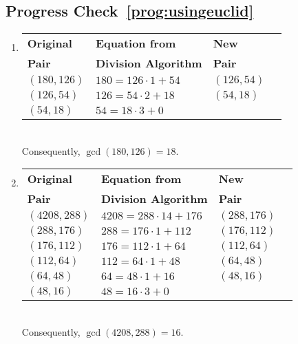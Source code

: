 \subsection*{Progress Check~\ref{prog:usingeuclid}}
\begin{enumerate}
\item \begin{tabular}[t]{| l | l | l | l |}
  \hline
  \textbf{Original}  &  \textbf{Equation from}    &  \textbf{New}    \\
  \textbf{Pair}     &  \textbf{Division Algorithm} &  \textbf{Pair}  \\ \hline
$( {180, 126} )$  &  	$180 = 126 \cdot 1  + 54 $  &  $( {126, 54} )$  \\ \hline
$( {126, 54} )$  &  $126 = 54 \cdot 2 + 18 $   &  $( {54, 18} )$    \\ \hline
$( {54, 18} )$  &  $54 = 18 \cdot 3 + 0 $   &      \\ \hline
\end{tabular}
\\ Consequently,  $\gcd( {180, 126} ) = 18$.

\enlargethispage{\baselineskip}
\item \begin{tabular}[t]{| l | l | l | l |}
  \hline
  \textbf{Original}  &  \textbf{Equation from}    &  \textbf{New}    \\
  \textbf{Pair}     &  \textbf{Division Algorithm} &  \textbf{Pair}  \\ \hline
$( {4208, 288} )$  &  	$4208 = 288 \cdot 14  + 176 $  &  
$( {288, 176} )$  \\ \hline
$( {288, 176} )$  &  	$288 = 176 \cdot 1  + 112 $  &  
$( {176,112} )$  \\ \hline
$( {176,112} )$  &  	$176 = 112 \cdot 1  + 64 $  &  
$( {112,64} )$  \\ \hline
$( {112,64} )$  &  	$112 = 64 \cdot 1  + 48 $  &  
$( {64, 48} )$  \\ \hline
$( {64, 48} )$  &  	$64 = 48 \cdot 1  + 16 $  &  
$( {48, 16} )$  \\ \hline
$( {48, 16} )$  &  	$48 = 16 \cdot 3  + 0 $  &  
                         \\ \hline
\end{tabular}
\\ Consequently,  $\gcd( {4208, 288} ) = 16$.
\end{enumerate}


